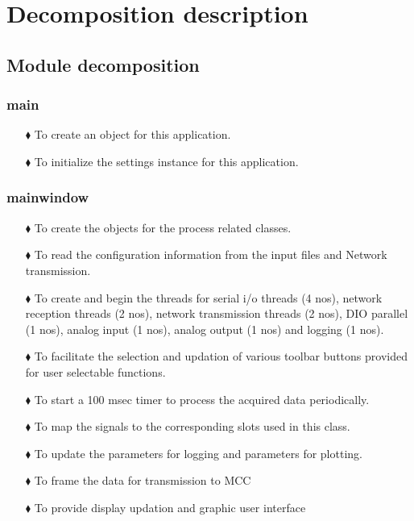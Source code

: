 \chapter{Decomposition description}
\label{Chapter2}
\section{Module decomposition}
\subsection{main}
\begin{enumerate}
	\item [$\blacklozenge$] To create an object for this application.
	\item [$\blacklozenge$] To initialize the settings instance for this application.	
\end{enumerate}
 
  \subsection{mainwindow}
  
  \begin{enumerate}
  	\item [$\blacklozenge$] To create the objects for the process related  classes.
  	\item [$\blacklozenge$] To read the configuration information from the input files and Network transmission.
  	\item [$\blacklozenge$] To create and begin the threads for serial i/o threads (4 nos), network reception threads (2 nos), network transmission threads (2 nos), DIO parallel (1 nos), analog input (1 nos), analog output (1 nos) and logging (1 nos).
  	\item [$\blacklozenge$] To facilitate the selection and updation of various toolbar buttons provided for user selectable functions.
  	\item [$\blacklozenge$] To start a 100 msec timer to process the acquired data periodically.
  	\item [$\blacklozenge$] To map the signals to the corresponding slots used in this class.
  	\item [$\blacklozenge$] To update the parameters for logging and parameters for plotting.
  	\item [$\blacklozenge$] To frame the data for transmission to MCC
  	\item [$\blacklozenge$] To provide display updation and graphic user interface
  		
  \end{enumerate}

